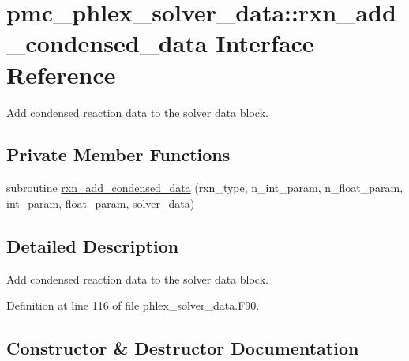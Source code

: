 \hypertarget{interfacepmc__phlex__solver__data_1_1rxn__add__condensed__data}{}\section{pmc\+\_\+phlex\+\_\+solver\+\_\+data\+:\+:rxn\+\_\+add\+\_\+condensed\+\_\+data Interface Reference}
\label{interfacepmc__phlex__solver__data_1_1rxn__add__condensed__data}


Add condensed reaction data to the solver data block.  


\subsection*{Private Member Functions}
\begin{DoxyCompactItemize}
\item 
subroutine \mbox{\hyperlink{interfacepmc__phlex__solver__data_1_1rxn__add__condensed__data_a176191f6f2c45cd7b3b0c11cd5b48404}{rxn\+\_\+add\+\_\+condensed\+\_\+data}} (rxn\+\_\+type, n\+\_\+int\+\_\+param, n\+\_\+float\+\_\+param, int\+\_\+param, float\+\_\+param, solver\+\_\+data)
\end{DoxyCompactItemize}


\subsection{Detailed Description}
Add condensed reaction data to the solver data block. 

Definition at line 116 of file phlex\+\_\+solver\+\_\+data.\+F90.



\subsection{Constructor \& Destructor Documentation}
\mbox{\label{interfacepmc__phlex__solver__data_1_1rxn__add__condensed__data_a176191f6f2c45cd7b3b0c11cd5b48404}} 
